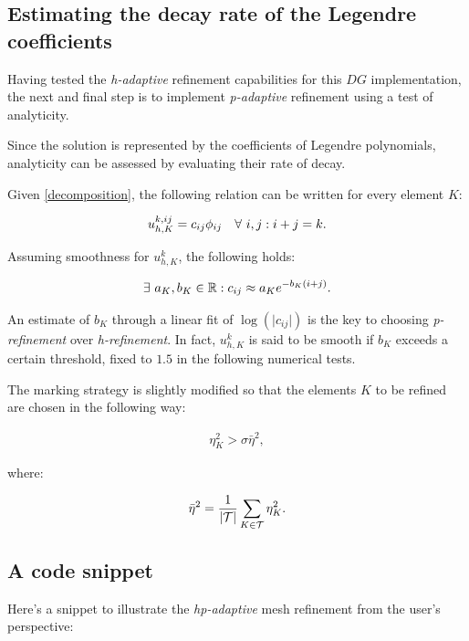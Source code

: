 \subsection{Estimating the decay rate of the Legendre coefficients}

Having tested the \textit{h-adaptive} refinement capabilities for this $DG$ implementation, the next and final step is to implement \textit{p-adaptive} refinement using a test of analyticity.

\cite{Eibner2007} Since the solution is represented by the coefficients of Legendre polynomials, analyticity can be assessed by evaluating their rate of decay.

Given \eqref{decomposition}, the following relation can be written for every element $K$:

\begin{gather}
    u^{k, ij}_{h, K} = c_{ij} \phi_{ij} \quad \forall ~ i, j : i + j = k.
\end{gather}

Assuming smoothness for $u^k_{h, K}$, the following holds:

\begin{gather}
    \exists ~ a_K, b_K \in \mathbb{R} : c_{ij} \approx a_K e^{-b_K (i + j)}.
\end{gather}

An estimate of $b_K$ through a linear fit of $\log(\lvert c_{ij} \rvert)$ is the key to choosing \textit{p-refinement} over \textit{h-refinement}. In fact, $u^k_{h, K}$ is said to be smooth if $b_K$ exceeds a certain threshold, fixed to $1.5$ in the following numerical tests.

The marking strategy is slightly modified so that the elements $K$ to be refined are chosen in the following way:

\begin{gather}
    \eta_K^2 > \sigma \bar{\eta}^2,
\end{gather}

where:

\begin{gather}
    \bar{\eta}^2 = \frac{1}{\lvert \mathcal{T} \rvert} \sum_{K \in \mathcal{T}} \eta_K^2.
\end{gather}

\newpage
\subsection{A code snippet}

Here's a snippet to illustrate the \textit{hp-adaptive} mesh refinement from the user's perspective:

